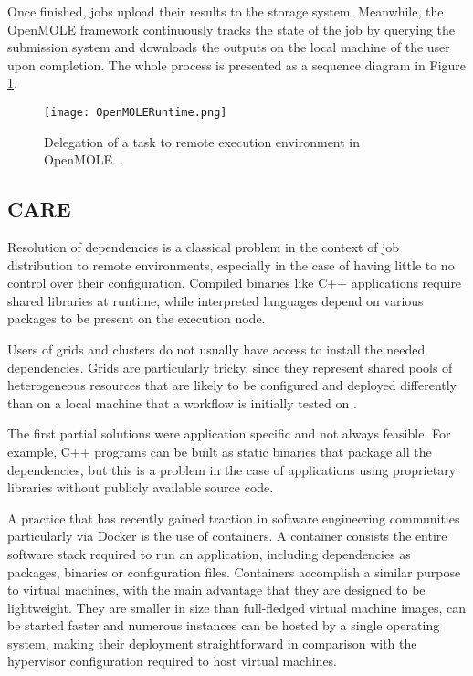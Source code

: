 Once finished, jobs upload their results to the storage system. Meanwhile, the OpenMOLE framework continuously tracks the state of the job by querying the submission system and downloads the outputs on the local machine of the user upon completion. The whole process is presented as a sequence diagram in Figure \ref{OpenMOLERuntime}.

\begin{figure}[H]
	\centering
		\texttt{[image: OpenMOLERuntime.png]}
	\caption{Delegation of a task to remote execution environment in OpenMOLE. \cite{Reuillon2010}.}
	\label{OpenMOLERuntime}
\end{figure}

\subsection{CARE} \label{CARESection}

Resolution of dependencies is a classical problem in the context of job distribution to remote environments, especially in the case of having little to no control over their configuration. Compiled binaries like C++ applications require shared libraries at runtime, while interpreted languages depend on various packages to be present on the execution node. 

Users of grids and clusters do not usually have access to install the needed dependencies. Grids are particularly tricky, since they represent shared pools of heterogeneous resources that are likely to be configured and deployed differently than on a local machine that a workflow is initially tested on \cite{Leclaire2016}.

The first partial solutions were application specific and not always feasible. For example, C++ programs can be built as static binaries that package all the dependencies, but this is a problem in the case of applications using proprietary libraries without publicly available source code.

A practice that has recently gained traction in software engineering communities particularly via Docker \cite{Docker} is the use of containers. A container consists the entire software stack required to run an application, including dependencies as packages, binaries or configuration files. Containers accomplish a similar purpose to virtual machines, with the main advantage that they are designed to be lightweight. They are smaller in size than full-fledged virtual machine images, can be started faster and numerous instances can be hosted by a single operating system, making their deployment straightforward in comparison with the hypervisor configuration required to host virtual machines.

